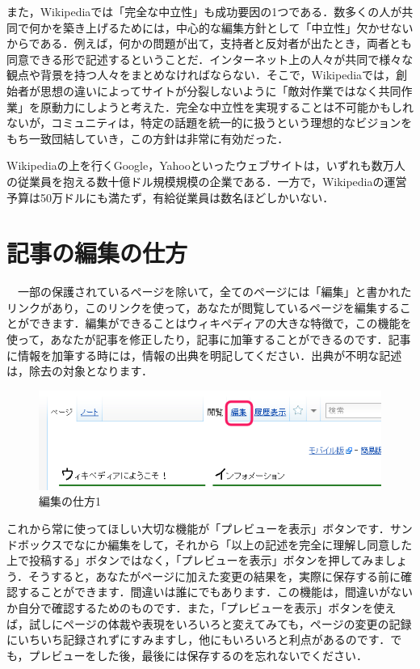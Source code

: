 また，Wikipediaでは「完全な中立性」も成功要因の1つである．数多くの人が共同で何かを築き上げるためには，中心的な編集方針として「中立性」欠かせないからである．例えば，何かの問題が出て，支持者と反対者が出たとき，両者とも同意できる形で記述するということだ．インターネット上の人々が共同で様々な観点や背景を持つ人々をまとめなければならない．そこで，Wikipediaでは，創始者が思想の違いによってサイトが分裂しないように「敵対作業ではなく共同作業」を原動力にしようと考えた．完全な中立性を実現することは不可能かもしれないが，コミュニティは，特定の話題を統一的に扱うという理想的なビジョンをもち一致団結していき，この方針は非常に有効だった．



Wikipediaの上を行くGoogle，Yahooといったウェブサイトは，いずれも数万人の従業員を抱える数十億ドル規模規模の企業である．一方で，Wikipediaの運営予算は50万ドルにも満たず，有給従業員は数名ほどしかいない．





\section{記事の編集の仕方}

　一部の保護されているページを除いて，全てのページには「編集」と書かれたリンクがあり，このリンクを使って，あなたが閲覧しているページを編集することができます．編集ができることはウィキペディアの大きな特徴で，この機能を使って，あなたが記事を修正したり，記事に加筆することができるのです．記事に情報を加筆する時には，情報の出典を明記してください．出典が不明な記述は，除去の対象となります．\cite{wikiEdit}

\begin{figure}[H]
\centering
\includegraphics[width=13cm]{sample1.png}
\caption{編集の仕方1}\label{サンプル図}
\end{figure}

これから常に使ってほしい大切な機能が「プレビューを表示」ボタンです．サンドボックスでなにか編集をして，それから「以上の記述を完全に理解し同意した上で投稿する」ボタンではなく，「プレビューを表示」ボタンを押してみましょう．そうすると，あなたがページに加えた変更の結果を，実際に保存する前に確認することができます．間違いは誰にでもあります．この機能は，間違いがないか自分で確認するためのものです．また，「プレビューを表示」ボタンを使えば，試しにページの体裁や表現をいろいろと変えてみても，ページの変更の記録にいちいち記録されずにすみますし，他にもいろいろと利点があるのです．でも，プレビューをした後，最後には保存するのを忘れないでください．\cite{wikiEdit}

